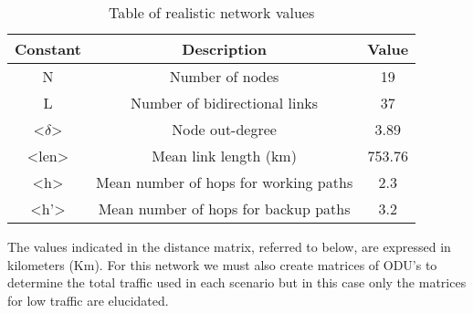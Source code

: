 \begin{table}[h!]
\centering
\begin{tabular}{|| c | c | c||}
 \hline
 Constant & Description & Value \\
 \hline\hline
 N & Number of nodes & 19 \\
 L & Number of bidirectional links & 37 \\
 <$\delta$> & Node out-degree & 3.89 \\
 <len> & Mean link length (km) & 753.76 \\
 <h> & Mean number of hops for working paths & 2.3 \\
 <h'> & Mean number of hops for backup paths & 3.2 \\
 \hline
\end{tabular}
\caption{Table of realistic network values}
\label{table:6}
\end{table}

The values indicated in the distance matrix, referred to below, are expressed in kilometers (Km).
For this network we must also create matrices of ODU's to determine the total traffic used in each scenario but in this case only the matrices for low traffic are elucidated.


